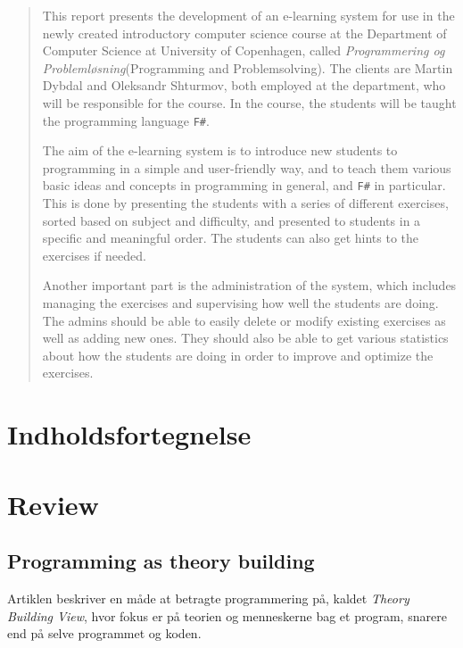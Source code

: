 \documentclass[11pt, a4paper]{article}
\begin{document}
\begin{abstract}
This report presents the development of an e-learning system for use in the newly created introductory computer science course at the Department of Computer Science at University of Copenhagen, called \emph{Programmering og Problemløsning}(Programming and Problemsolving). The clients are Martin Dybdal and Oleksandr Shturmov, both employed at the department, who will be responsible for the course. In the course, the students will be taught the programming language \verb!F#!.

The aim of the e-learning system is to introduce new students to programming in a simple and user-friendly way, and to teach them various basic ideas and concepts in programming in general, and \verb!F#! in particular. This is done by presenting the students with a series of different exercises, sorted based on subject and difficulty, and presented to students in a specific and meaningful order. The students can also get hints to the exercises if needed.

Another important part is the administration of the system, which includes managing the exercises and supervising how well the students are doing. The admins should be able to easily delete or modify existing exercises as well as adding new ones. They should also be able to get various statistics about how the students are doing in order to improve and optimize the exercises.
\end{abstract}
\newpage

\section*{Indholdsfortegnelse}
\label{sec:toc}
\makeatletter
{}
\makeatother

\thispagestyle{empty}
\newpage

\pagestyle{plain}
\setcounter{page}{1}

\section{Review}
\label{sec:review}

\subsection{Programming as theory building}
\label{sub:programming_as_theory_building}
Artiklen beskriver en måde at betragte programmering på, kaldet \emph{Theory Building View}, hvor fokus er på teorien og menneskerne bag et program, snarere end på selve programmet og koden.
\end{document}
